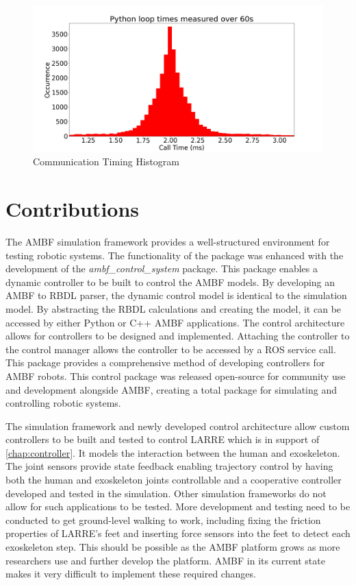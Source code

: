   
 \begin{figure}
     \centering
     \includegraphics[scale=0.35]{images/sim/loop_timming.png}
     \caption[Communication Timing Histogram]{Communication Timing Histogram}
     \label{fig:CommunicationHistogram}
 \end{figure}
 


\section{Contributions}

The AMBF simulation framework provides a well-structured environment for testing robotic systems. The functionality of the package was enhanced with the development of the \textit{ambf\_control\_system} package. This package enables a dynamic controller to be built to control the AMBF models. By developing an AMBF to RBDL parser, the dynamic control model is identical to the simulation model. By abstracting the RBDL calculations and creating the model, it can be accessed by either Python or C++ AMBF applications. The control architecture allows for controllers to be designed and implemented. Attaching the controller to the control manager allows the controller to be accessed by a ROS service call. This package provides a comprehensive method of developing controllers for AMBF robots. This control package was released open-source for community use and development alongside AMBF, creating a total package for simulating and controlling robotic systems.   

The simulation framework and newly developed control architecture allow custom controllers to be built and tested to control LARRE which is in support of \autoref{chap:controller}. It models the interaction between the human and exoskeleton. The joint sensors provide state feedback enabling trajectory control by having both the human and exoskeleton joints controllable and a cooperative controller developed and tested in the simulation. Other simulation frameworks do not allow for such applications to be tested. More development and testing need to be conducted to get ground-level walking to work, including fixing the friction properties of LARRE's feet and inserting force sensors into the feet to detect each exoskeleton step. This should be possible as the AMBF platform grows as more researchers use and further develop the platform. AMBF in its current state makes it very difficult to implement these required changes.   



